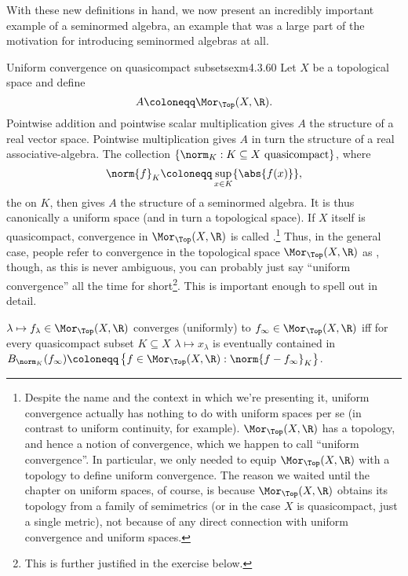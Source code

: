 With these new definitions in hand, we now present an incredibly important example of a seminormed algebra, an example that was a large part of the motivation for introducing seminormed algebras at all.
\begin{exm}{Uniform convergence on quasicompact subsets}{exm4.3.60}
Let $X$ be a topological space and define
\begin{equation}
A\coloneqq \Mor _{\Top}(X,\R ).
\end{equation}
Pointwise addition and pointwise scalar multiplication gives $A$ the structure of a real vector space.  Pointwise multiplication gives $A$ in turn the structure of a real associative-algebra.  The collection $\{ \norm _K:K\subseteq X\text{ quasicompact}\}$, where
\begin{equation}
\norm{f}_K\coloneqq \sup _{x\in K}\{ \abs{f(x)}\} ,
\end{equation}
the  on $K$, then gives $A$ the structure of a seminormed algebra.  It is thus canonically a uniform space (and in turn a topological space).  If $X$ itself is quasicompact, convergence in $\Mor _{\Top}(X,\R )$ is called .\footnote{Despite the name and the context in which we're presenting it, uniform convergence actually has nothing to do with uniform spaces per se (in contrast to uniform continuity, for example).  $\Mor _{\Top}(X,\R )$ has a topology, and hence a notion of convergence, which we happen to call ``uniform convergence''.  In particular, we only needed to equip $\Mor _{\Top}(X,\R )$ with a topology to define uniform convergence.  The reason we waited until the chapter on uniform spaces, of course, is because $\Mor _{\Top}(X,\R )$ obtains its topology from a family of semimetrics (or in the case $X$ is quasicompact, just a single metric), not because of any direct connection with uniform convergence and uniform spaces.}  Thus, in the general case, people refer to convergence in the topological space $\Mor _{\Top}(X,\R )$ as , though, as this is never ambiguous, you can probably just say ``uniform convergence'' all the time for short\footnote{This is further justified in the exercise below.}.  This is important enough to spell out in detail.
\begin{important}
$\lambda \mapsto f_{\lambda}\in \Mor _{\Top}(X,\R )$ converges (uniformly) to $f_{\infty}\in \Mor _{\Top}(X,\R )$ iff for every quasicompact subset $K\subseteq X$ $\lambda \mapsto x_{\lambda}$ is eventually contained in $B_{\norm _K}(f_{\infty})\coloneqq \left\{ f\in \Mor _{\Top}(X,\R ):\norm{f-f_{\infty}}_K\right\} $.  

\end{important}
\end{exm}
